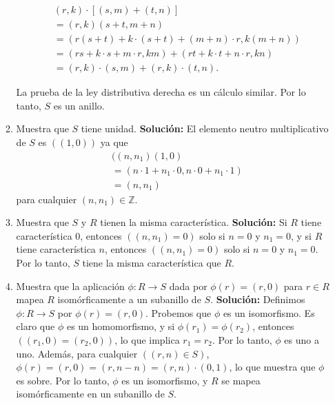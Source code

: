 \begin{enumerate}
\begin{enumerate}
		\begin{align*}
			&(r, k) \cdot [(s, m) + (t, n)] \\
			&= (r, k)(s + t, m + n) \\
			&= \left(r(s + t) + k \cdot (s + t) + (m + n) \cdot r, k(m + n)\right) \\
			&= (rs + k \cdot s + m \cdot r, km) + (rt + k \cdot t + n \cdot r, kn) \\
			&= (r, k) \cdot (s, m) + (r, k) \cdot (t, n).
		\end{align*}
		
		La prueba de la ley distributiva derecha es un cálculo similar. Por lo tanto, \(S\) es un anillo.

		\item Muestra que $S$ tiene unidad.
		\textbf{Solución:}
		El elemento neutro multiplicativo de $S$ es $((1, 0))$ ya que 
		\begin{align*}
			&((n, n_1)(1, 0) \\
			&= (n \cdot 1 + n_1 \cdot 0, n \cdot 0 + n_1 \cdot 1) \\
			&= (n, n_1)
		\end{align*}
		para cualquier $(n, n_1) \in \mathbb{Z}$.
		\item Muestra que $S$ y $R$ tienen la misma característica.
		\textbf{Solución:}
		 Si $R$ tiene característica 0, entonces $((n, n_1) = 0)$ solo si $n = 0$ y $n_1 = 0$, y si $R$ tiene característica $n$, entonces $((n, n_1) = 0)$ solo si $n = 0$ y $n_1 = 0$. Por lo tanto, $S$ tiene la misma característica que $R$.
		
		\item Muestra que la aplicación $\phi : R \rightarrow S$ dada por $\phi(r) = (r, 0)$ para $r \in R$ mapea $R$ isomórficamente a un subanillo de $S$.
		\textbf{Solución:}
		Definimos $\phi : R \rightarrow S$ por $\phi(r) = (r, 0)$. Probemos que $\phi$ es un isomorfismo. Es claro que $\phi$ es un homomorfismo, y si $\phi(r_1) = \phi(r_2)$, entonces $((r_1, 0) = (r_2, 0))$, lo que implica $r_1 = r_2$. Por lo tanto, $\phi$ es uno a uno. Además, para cualquier $((r, n) \in S)$, $\phi(r) = (r, 0) = (r, n - n) = (r, n) \cdot (0, 1)$, lo que muestra que $\phi$ es sobre. Por lo tanto, $\phi$ es un isomorfismo, y $R$ se mapea isomórficamente en un subanillo de $S$.
	\end{enumerate}

\end{enumerate}



